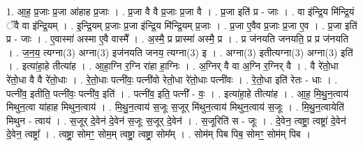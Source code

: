 \documentclass[17pt]{extarticle}
\begin{document}
1. आ॒ह॒ प्र॒जाः प्र॒जा आ॑हाह प्र॒जाः । . प्र॒जा वै वै प्र॒जाः प्र॒जा वै । . प्र॒जा इति॑ प्र - जाः । . वा इ॑न्द्रि॒य मि॑न्द्रि॒यं ॅवै वा इ॑न्द्रि॒यम् । . इ॒न्द्रि॒यम् प्र॒जाः प्र॒जा इ॑न्द्रि॒य मि॑न्द्रि॒यम् प्र॒जाः । . प्र॒जा ए॒वैव प्र॒जाः प्र॒जा ए॒व । . प्र॒जा इति॑ प्र - जाः । . ए॒वास्मा॑ अस्मा ए॒वै वास्मै᳚ । . अ॒स्मै॒ प्र प्रास्मा॑ अस्मै॒ प्र । . प्र ज॑नयति जनयति॒ प्र प्र ज॑नयति । . ज॒न॒य॒ त्यग्ना(3) अग्ना(3) इज॑नयति जनय॒ त्यग्ना(3) इ । . अग्ना(3) इतीत्यग्ना(3) अग्ना(3) इति॑ । . इत्या॑हा॒हे तीत्या॑ह । . आ॒हा॒ग्नि र॒ग्नि रा॑हा हा॒ग्निः । . अ॒ग्निर् वै वा अ॒ग्नि र॒ग्निर् वै । . वै रे॑तो॒धा रे॑तो॒धा वै वै रे॑तो॒धाः । . रे॒तो॒धाः पत्नी॑वः॒ पत्नी॑वो रेतो॒धा रे॑तो॒धाः पत्नी॑वः । . रे॒तो॒धा इति॑ रेतः - धाः । . पत्नी॑व॒ इतीति॒ पत्नी॑वः॒ पत्नी॑व॒ इति॑ । . पत्नी॑व॒ इति॒ पत्नी᳚ - वः॒ । . इत्या॑हा॒हे तीत्या॑ह । . आ॒ह॒ मि॒थु॒न॒त्वाय॑ मिथुन॒त्वा या॑हाह मिथुन॒त्वाय॑ । . मि॒थु॒न॒त्वाय॑ स॒जूः स॒जूर् मि॑थुन॒त्वाय॑ मिथुन॒त्वाय॑ स॒जूः । . मि॒थु॒न॒त्वायेति॑ मिथुन - त्वाय॑ । . स॒जूर् दे॒वेन॑ दे॒वेन॑ स॒जूः स॒जूर् दे॒वेन॑ । . स॒जूरिति॑ स - जूः । . दे॒वेन॒ त्वष्ट्रा॒ त्वष्ट्रा॑ दे॒वेन॑ दे॒वेन॒ त्वष्ट्रा᳚ । . त्वष्ट्रा॒ सोमꣳ॒॒ सोम॒म् त्वष्ट्रा॒ त्वष्ट्रा॒ सोम᳚म् । . सोम॑म् पिब पिब॒ सोमꣳ॒॒ सोम॑म् पिब । \newline
\end{document}
